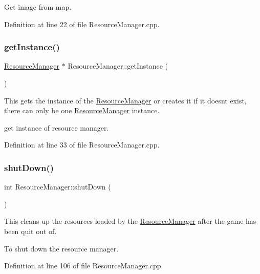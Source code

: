Get image from map. 

Definition at line 22 of file Resource\+Manager.\+cpp.

\mbox{\label{class_resource_manager_a41943f7fb045ad54f1e24da7c6046502}} 
\subsubsection{\texorpdfstring{getInstance()}{getInstance()}}
{\footnotesize\ttfamily \mbox{\hyperlink{class_resource_manager}{Resource\+Manager}} $\ast$ Resource\+Manager\+::get\+Instance (\begin{DoxyParamCaption}{ }\end{DoxyParamCaption})\hspace{0.3cm}{\ttfamily [static]}}



This gets the instance of the \mbox{\hyperlink{class_resource_manager}{Resource\+Manager}} or creates it if it doesn\textquotesingle{}t exist, there can only be one \mbox{\hyperlink{class_resource_manager}{Resource\+Manager}} instance. 

get instance of resource manager. 

Definition at line 33 of file Resource\+Manager.\+cpp.

\mbox{\label{class_resource_manager_ab8d9779f5f957610d272525cc32a775e}} 
\subsubsection{\texorpdfstring{shutDown()}{shutDown()}}
{\footnotesize\ttfamily int Resource\+Manager\+::shut\+Down (\begin{DoxyParamCaption}{ }\end{DoxyParamCaption})}



This cleans up the resources loaded by the \mbox{\hyperlink{class_resource_manager}{Resource\+Manager}} after the game has been quit out of. 

To shut down the resource manager. 

Definition at line 106 of file Resource\+Manager.\+cpp.

